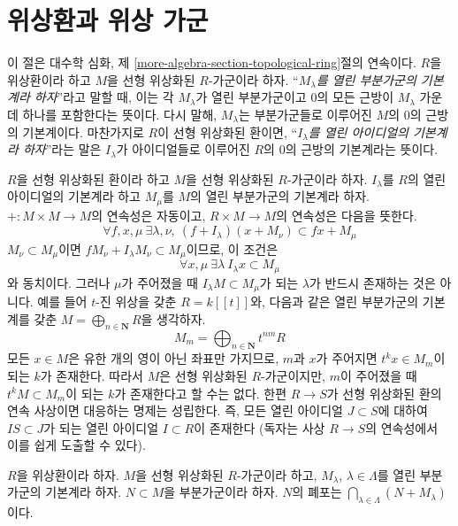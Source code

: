 \section{위상환과 위상 가군}
\label{section-topological-module}

\noindent
이 절은 대수학 심화, 제
\ref{more-algebra-section-topological-ring}절의 연속이다.
$R$을 위상환이라 하고 $M$을 선형 위상화된 $R$-가군이라 하자.
``{\it $M_\lambda$를 열린 부분가군의 기본계라 하자}''라고 말할 때,
이는 각 $M_\lambda$가 열린 부분가군이고 $0$의 모든 근방이
$M_\lambda$ 가운데 하나를 포함한다는 뜻이다. 다시 말해,
$M_\lambda$는 부분가군들로 이루어진 $M$의 $0$의 근방의 기본계이다.
마찬가지로 $R$이 선형 위상화된 환이면,
``{\it $I_\lambda$를 열린 아이디얼의 기본계라 하자}''라는 말은
$I_\lambda$가 아이디얼들로 이루어진 $R$의 $0$의 근방의
기본계라는 뜻이다.

\begin{example}
\label{example-what-does-it-mean}
$R$을 선형 위상화된 환이라 하고 $M$을 선형 위상화된
$R$-가군이라 하자. $I_\lambda$를 $R$의 열린 아이디얼의 기본계라
하고 $M_\mu$를 $M$의 열린 부분가군의 기본계라 하자.
$+ : M \times M \to M$의 연속성은 자동이고,
$R \times M \to M$의 연속성은 다음을 뜻한다.
$$
\forall f, x, \mu\ \exists \lambda, \nu,\ (f + I_\lambda)(x + M_\nu)
\subset fx + M_\mu
$$
$M_\nu \subset M_\mu$이면
$fM_\nu + I_\lambda M_\nu \subset M_\mu$이므로, 이 조건은
$$
\forall x, \mu\ \exists \lambda\ I_\lambda x \subset M_\mu
$$
와 동치이다. 그러나 $\mu$가 주어졌을 때
$I_\lambda M \subset M_\mu$가 되는 $\lambda$가 반드시 존재하는 것은
아니다. 예를 들어 $t$-진 위상을 갖춘 $R = k[[t]]$와, 다음과 같은
열린 부분가군의 기본계를 갖춘 $M = \bigoplus_{n \in \mathbf{N}} R$을
생각하자.
$$
M_m = \bigoplus\nolimits_{n \in \mathbf{N}} t^{nm}R
$$
모든 $x \in M$은 유한 개의 영이 아닌 좌표만 가지므로,
$m$과 $x$가 주어지면 $t^k x \in M_m$이 되는 $k$가 존재한다.
따라서 $M$은 선형 위상화된 $R$-가군이지만, $m$이 주어졌을 때
$t^kM \subset M_m$이 되는 $k$가 존재한다고 할 수는 없다.
한편 $R \to S$가 선형 위상화된 환의 연속 사상이면 대응하는 명제는
성립한다. 즉, 모든 열린 아이디얼 $J \subset S$에 대하여
$IS \subset J$가 되는 열린 아이디얼 $I \subset R$이 존재한다
(독자는 사상 $R \to S$의 연속성에서 이를 쉽게 도출할 수 있다).
\end{example}

\begin{lemma}
\label{lemma-closed}
$R$을 위상환이라 하자. $M$을 선형 위상화된 $R$-가군이라 하고,
$M_\lambda$, $\lambda \in \Lambda$를 열린 부분가군의 기본계라 하자.
$N \subset M$을 부분가군이라 하자. $N$의 폐포는
$\bigcap_{\lambda \in \Lambda} (N + M_\lambda)$이다.
\end{lemma}

